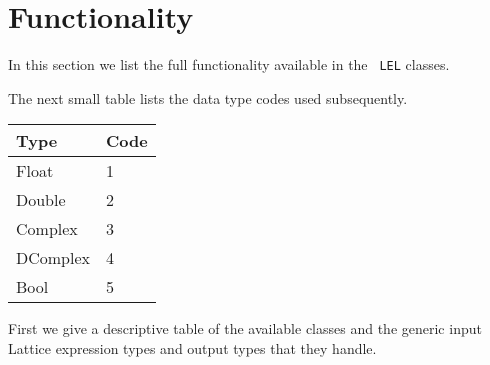 \section {Functionality}

In this section we list the full functionality available in the {\tt
LEL} classes.    

The next small table lists the data type codes used subsequently.

\begin{center}
\begin{tabular}{|l|l}
\hline
Type & Code \\
\hline
Float      & 1 \\
Double     & 2 \\
Complex    & 3 \\
DComplex   & 4 \\
Bool       & 5 \\
\hline
\end{tabular}
\end{center}


First we give a descriptive table of the available classes and the generic input
Lattice expression types and output types that they handle.


